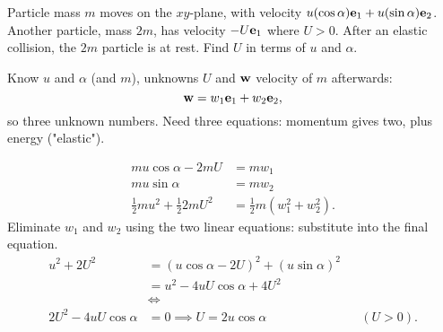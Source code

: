 \documentclass[10pt, a4paper]{article}
\begin{document}
\begin{problem}[$2019$ exam]
    Particle mass $m$ moves on the $xy$-plane,
    with velocity $u(\cos{\alpha})\mathbf{e}_1 + u(\sin{\alpha})\mathbf{e}_2$.
    Another particle,
    mass $2m$,
    has velocity $-U\mathbf{e}_1$ where $U > 0$.
    After an elastic collision,
    the $2m$ particle is at rest.
    Find $U$ in terms of $u$ and $\alpha$.

    \begin{solution}
        Know $u$ and $\alpha$
        (and $m$),
        unknowns $U$ and $\mathbf{w}$ velocity of $m$ afterwards:
        \[
        \mathbf{w} = w_1\mathbf{e}_1 + w_2\mathbf{e}_2,
        \]
        so three unknown numbers.
        Need three equations:
        momentum gives two,
        plus energy
        ("elastic").

        \begin{align*}
            mu\cos{\alpha} - 2mU &= mw_1 \\
            mu\sin{\alpha} &= mw_2 \\
            \frac{1}{2}mu ^ 2 + \frac{1}{2}2mU ^ 2 &= \frac{1}{2}m(w_1 ^ 2 + w_2 ^ 2).
        \end{align*}
        Eliminate $w_1$ and $w_2$ using the two linear equations:
        substitute into the final equation.
        \begin{align*}
            u ^ 2 + 2U ^ 2 &= (u\cos{\alpha} - 2U) ^ 2 + (u\sin{\alpha}) ^ 2 \\
            &= u ^ 2 - 4uU\cos{\alpha} + 4U ^ 2 \\
            &\iff \\
            2U ^ 2 - 4uU\cos{\alpha} &= 0 \implies U = 2u\cos{\alpha} && (U > 0).
        \end{align*}
    \end{solution}
\end{problem}
\end{document}
